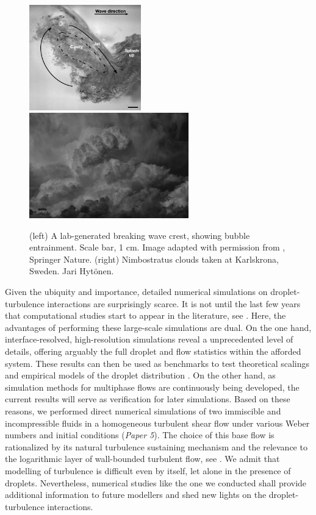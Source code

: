 \begin{figure}%
  \centering
  \includegraphics[height=4.57cm]{ocean_wave.png}
  \includegraphics[height=4.57cm]{nimbus_cloud.png}
  \caption{(left) A lab-generated breaking wave crest, showing bubble entrainment. Scale bar, 1 cm. Image adapted with permission from \cite{deane_stokes_2002a}, \textcopyright \enspace Springer Nature. (right) Nimbostratus clouds taken at Karlskrona, Sweden. \textcopyright \enspace Jari Hyt\"onen.}
  \label{fig:wave-cloud}
\end{figure}

Given the ubiquity and importance, detailed numerical simulations on droplet-turbulence interactions are surprisingly scarce. It is not until the last few years that computational studies start to appear in the literature, see \cite{perlekar_biferale_sbragaglia_srivastava_toschi_2012a, skartlien_sollum_schumann_2013a, komrakova_eskin_derksen_2015a, scarbolo_bianco_soldati_2015a, dodd_ferrante_2016a}.
Here, the advantages of performing these large-scale simulations are dual.
On the one hand, interface-resolved, high-resolution simulations reveal a unprecedented level of details, offering arguably the full droplet and flow statistics within the afforded system. These results can then be used as benchmarks to test theoretical scalings and empirical models of the droplet distribution \citep{hinze_1955a, deane_stokes_2002a}.
On the other hand, as simulation methods for multiphase flows are continuously being developed, the current results will serve as verification for later simulations.
Based on these reasons, we performed direct numerical simulations of two immiscible and incompressible fluids in a homogeneous turbulent shear flow under various Weber numbers and initial conditions (\emph{Paper 5}).
The choice of this base flow is rationalized by its natural turbulence sustaining mechanism and the relevance to the logarithmic layer of wall-bounded turbulent flow, see \eg \cite{pumir_1996a, sekimoto_dong_jimenez_2016a}.
We admit that modelling of turbulence is difficult even by itself, let alone in the presence of droplets.
Nevertheless, numerical studies like the one we conducted shall provide additional information to future modellers and shed new lights on the droplet-turbulence interactions.



